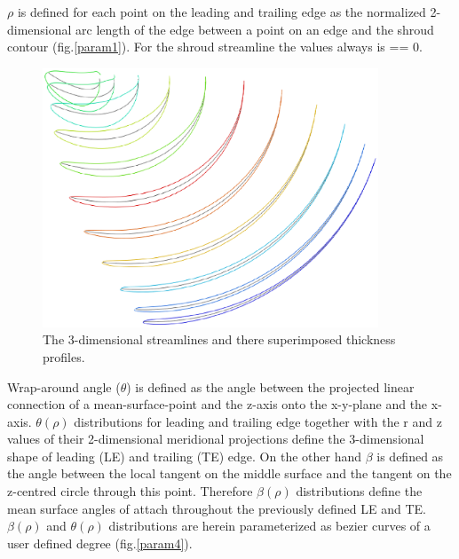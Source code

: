 
$\rho$ is defined for each point on the leading and trailing edge as the normalized  2-dimensional arc length of the edge between a point on an edge and the shroud contour (fig.\ref{param1}). For the shroud streamline the values always is == 0. 

\begin{figure}[h!]
\centering
\includegraphics[width=100mm]{param3.eps} 
\caption{The 3-dimensional streamlines and there superimposed thickness profiles.}
\label{param3}
\end{figure}

Wrap-around angle ($\theta$) is defined as the angle between the projected linear connection of a mean-surface-point and the z-axis onto the x-y-plane and the x-axis. $\theta(\rho)$ distributions for leading and trailing edge together with the r and z values of their 2-dimensional meridional projections  define the 3-dimensional shape of leading (LE) and trailing (TE) edge. On the other hand $\beta$ is defined as the angle between the local tangent on the middle surface and the tangent on the z-centred circle through this point. Therefore $\beta(\rho)$ distributions define the mean surface angles of attach throughout the previously  defined LE and TE. $\beta(\rho)$ and $\theta(\rho)$ distributions are herein parameterized as bezier curves of a user defined degree (fig.\ref{param4}).  


